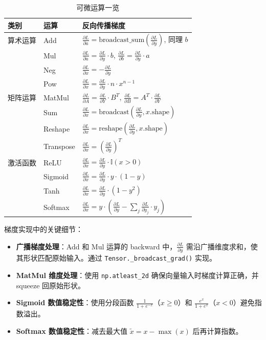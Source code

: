 \documentclass[12pt,a4paper]{ctexart}
\begin{document}
\begin{table}[H]
\centering
\caption{可微运算一览}
\begin{tabular}{@{}lll@{}}
\toprule
\textbf{类别} & \textbf{运算} & \textbf{反向传播梯度} \\
\midrule
算术运算   & Add    & $\frac{\partial L}{\partial a} = \text{broadcast\_sum}(\frac{\partial L}{\partial y})$, 同理 $b$ \\
          & Mul    & $\frac{\partial L}{\partial a} = \frac{\partial L}{\partial y} \cdot b$, $\frac{\partial L}{\partial b} = \frac{\partial L}{\partial y} \cdot a$ \\
          & Neg    & $\frac{\partial L}{\partial x} = -\frac{\partial L}{\partial y}$ \\
          & Pow    & $\frac{\partial L}{\partial x} = \frac{\partial L}{\partial y} \cdot n \cdot x^{n-1}$ \\
\midrule
矩阵运算   & MatMul & $\frac{\partial L}{\partial A} = \frac{\partial L}{\partial Y} \cdot B^T$, $\frac{\partial L}{\partial B} = A^T \cdot \frac{\partial L}{\partial Y}$ \\
          & Sum    & $\frac{\partial L}{\partial x} = \text{broadcast}(\frac{\partial L}{\partial y}, x.\text{shape})$ \\
          & Reshape& $\frac{\partial L}{\partial x} = \text{reshape}(\frac{\partial L}{\partial y}, x.\text{shape})$ \\
          & Transpose & $\frac{\partial L}{\partial x} = (\frac{\partial L}{\partial y})^T$ \\
\midrule
激活函数   & ReLU   & $\frac{\partial L}{\partial x} = \frac{\partial L}{\partial y} \cdot \mathbb{I}(x > 0)$ \\
          & Sigmoid& $\frac{\partial L}{\partial x} = \frac{\partial L}{\partial y} \cdot y \cdot (1-y)$ \\
          & Tanh   & $\frac{\partial L}{\partial x} = \frac{\partial L}{\partial y} \cdot (1 - y^2)$ \\
          & Softmax& $\frac{\partial L}{\partial x} = y \cdot (\frac{\partial L}{\partial y} - \sum_j \frac{\partial L}{\partial y_j} \cdot y_j)$ \\
\bottomrule
\end{tabular}
\end{table}

梯度实现中的关键细节：
\begin{itemize}
    \item \textbf{广播梯度处理}：Add 和 Mul 运算的 backward 中，$\frac{\partial L}{\partial y}$ 需沿广播维度求和，使其形状匹配原始输入。通过 \texttt{Tensor.\_broadcast\_grad()} 实现。
    \item \textbf{MatMul 维度处理}：使用 \texttt{np.atleast\_2d} 确保向量输入时梯度计算正确，并 squeeze 回原始形状。
    \item \textbf{Sigmoid 数值稳定性}：使用分段函数 $\frac{1}{1+e^{-x}}$（$x \ge 0$）和 $\frac{e^x}{1+e^x}$（$x < 0$）避免指数溢出。
    \item \textbf{Softmax 数值稳定性}：减去最大值 $\tilde{x} = x - \max(x)$ 后再计算指数。
\end{itemize}
\end{document}
